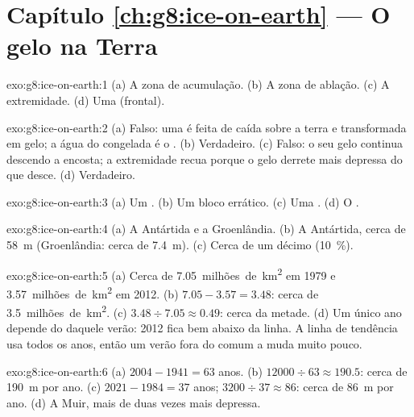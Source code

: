 \section*{Capítulo \ref{ch:g8:ice-on-earth} --- O gelo na Terra}

\begin{solution}{exo:g8:ice-on-earth:1}
(a) A zona de acumulação. (b) A zona de ablação. (c) A extremidade.
(d) Uma  (frontal).
\end{solution}

\begin{solution}{exo:g8:ice-on-earth:2}
(a) Falso: uma  é feita de  caída sobre a terra e transformada
em gelo; a água do  congelada é o . (b) Verdadeiro.
(c) Falso: o seu gelo continua descendo a encosta; a extremidade recua
porque o gelo derrete mais depressa do que desce. (d) Verdadeiro.
\end{solution}

\begin{solution}{exo:g8:ice-on-earth:3}
(a) Um . (b) Um bloco errático. (c) Uma . (d) O .
\end{solution}

\begin{solution}{exo:g8:ice-on-earth:4}
(a) A Antártida e a Groenlândia. (b) A Antártida, cerca de \qty{58}{m}
(Groenlândia: cerca de \qty{7.4}{m}). (c) Cerca de um décimo (10~\%).
\end{solution}

\begin{solution}{exo:g8:ice-on-earth:5}
(a) Cerca de \num{7.05}~milhões~de~\unit{km^2} em 1979 e \num{3.57}~milhões~de~\unit{km^2}
em 2012. (b) $7.05 - 3.57 = 3.48$: cerca de \num{3.5}~milhões~de~\unit{km^2}.
(c) $3.48 \div 7.05 \approx 0.49$: cerca da metade. (d) Um único ano
depende do  daquele verão: 2012 fica bem abaixo da linha. A linha de
tendência usa todos os anos, então um verão fora do comum a muda muito
pouco.
\end{solution}

\begin{solution}{exo:g8:ice-on-earth:6}
(a) $2004 - 1941 = 63$ anos. (b) $12000 \div 63 \approx 190.5$: cerca de
\qty{190}{m} por ano. (c) $2021 - 1984 = 37$ anos; $3200 \div 37 \approx
86$: cerca de \qty{86}{m} por ano. (d) A  Muir, mais de duas vezes
mais depressa.
\end{solution}

